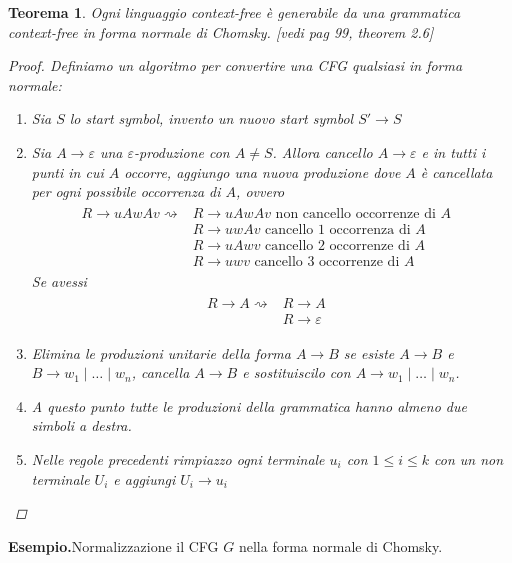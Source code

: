 \documentclass[italian]{article}
\newcommand{\taleche}{\;|\;}
\newtheorem*{theorem*}{Teorema}
\newcommand{\example}{\noindent\textbf{Esempio.\quad}}
\begin{document}
\begin{theorem*}
	Ogni linguaggio context-free è generabile da una grammatica context-free in forma normale di Chomsky. [vedi pag 99, theorem 2.6]
	\begin{proof}
		Definiamo un algoritmo per convertire una CFG qualsiasi in forma normale:
		\begin{enumerate}
			\item Sia $S$ lo start symbol, invento un nuovo start symbol $S' \to S$
			\item Sia $A \to \varepsilon$ una $\varepsilon$-produzione con $A \neq S$. Allora cancello $A \to \varepsilon$ e in tutti i punti in cui $A$ occorre, aggiungo una nuova produzione dove $A$ è cancellata per ogni possibile occorrenza di $A$, ovvero
				\begin{gather*}
			\begin{flalign*}
			R \to uAwAv \rightsquigarrow & R \to uAwAv \text{ non cancello occorrenze di $A$} & \\
			& R \to uwAv \text{ cancello 1 occorrenza di $A$} \\
			& R \to uAwv \text{ cancello 2 occorrenze di $A$} \\
			& R \to uwv \text{ cancello 3 occorrenze di $A$} 
			\end{flalign*}
			\end{gather*}
			Se avessi
			\begin{gather*}
			\begin{flalign*}
			R \to A \rightsquigarrow & R \to A & \\
			& R \to \varepsilon 
			\end{flalign*}
			\end{gather*}
			\item Elimina le produzioni unitarie della forma $A\to B$ se esiste $A\to B$ e $B \to w_1 \taleche \dots \taleche w_n$, cancella $A\to B$ e sostituiscilo con $A \to w_1 \taleche \dots \taleche w_n$.
			\item A questo punto tutte le produzioni della grammatica hanno almeno due simboli a destra.
			\item Nelle regole precedenti rimpiazzo ogni terminale $u_i$ con $1 \leq i \leq k$ con un non terminale $U_i$ e aggiungi $U_i \to u_i$
		\end{enumerate}
	\end{proof}
\end{theorem*}
\pagebreak
\example Normalizzazione il CFG $G$ nella forma normale di Chomsky. 
\end{document}
